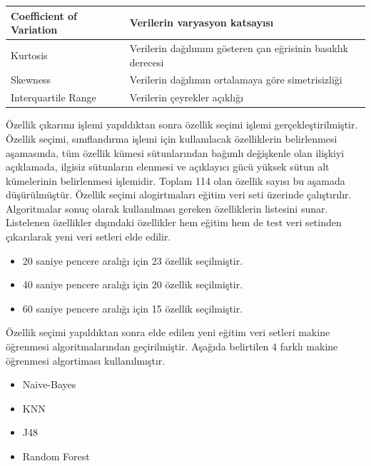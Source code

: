 \begin{table}[!htbp]
\begin{tabular}{|l|l|}
Coefficient of Variation               & Verilerin varyasyon katsayısı                                 \\ \hline
Kurtosis                               & Verilerin dağılımını gösteren çan eğrisinin basıklık derecesi \\ \hline
Skewness                               & Verilerin dağılımın ortalamaya göre simetrisizliği            \\ \hline
Interquartile Range                    & Verilerin çeyrekler açıklığı                                  \\ \hline
\end{tabular}
\end{table}

Özellik çıkarımı işlemi yapıldıktan sonra özellik seçimi işlemi gerçekleştirilmiştir. Özellik seçimi, sınıflandırma işlemi için kullanılacak özelliklerin belirlenmesi aşamasında, tüm özellik kümesi sütunlarından bağımlı değişkenle olan ilişkiyi açıklamada, ilgisiz sütunların elenmesi ve açıklayıcı gücü yüksek sütun alt kümelerinin belirlenmesi işlemidir. Toplam 114 olan özellik sayısı bu aşamada düşürülmüştür. Özellik seçimi alogirtmaları eğitim veri seti üzerinde çalıştırılır. Algoritmalar sonuç olarak kullanılması gereken özelliklerin listesini sunar. Listelenen özellikler dışındaki özellikler hem eğitim hem de test veri setinden çıkarılarak yeni veri setleri elde edilir.

\begin{itemize}
  \item 20 saniye pencere aralığı için 23 özellik seçilmiştir.
  \item 40 saniye pencere aralığı için 20 özellik seçilmiştir.
  \item 60 saniye pencere aralığı için 15 özellik seçilmiştir.
\end{itemize}

Özellik seçimi yapıldıktan sonra elde edilen yeni eğitim veri setleri makine öğrenmesi algoritmalarından geçirilmiştir. Aşağıda belirtilen 4 farklı makine öğrenmesi algortiması kullanılmıştır.
\begin{itemize}
  \item Naive-Bayes
  \item KNN
  \item J48
  \item Random Forest
\end{itemize}

